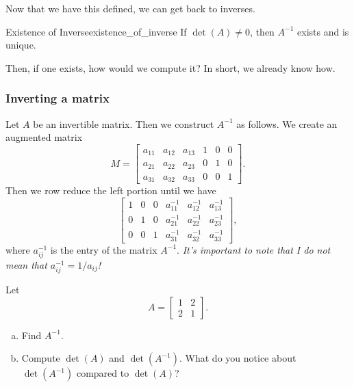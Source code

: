         Now that we have this defined, we can get back to inverses.
        
        \begin{prop}{Existence of Inverse}{existence_of_inverse}
        If $\det(A)\neq 0$, then $A^{-1}$ exists and is unique.
        \end{prop}
        
        Then, if one exists, how would we compute it?  In short, we already know how.
        
        \subsubsection{Inverting a matrix}
        
        Let $A$ be an invertible matrix.  Then we construct $A^{-1}$ as follows.  We create an augmented matrix
        \[
        M=
        \left[ \begin{array}{ccc|ccc}
        a_{11} & a_{12} & a_{13} & 1 & 0 & 0 \\
        a_{21} & a_{22} & a_{23} & 0 & 1 & 0 \\
        a_{31} & a_{32} & a_{33} & 0 & 0 & 1 
        \end{array} \right].
        \]
        Then we row reduce the left portion until we have
        \[
        \left[ \begin{array}{ccc|ccc}
        1 & 0 & 0 & a_{11}^{-1} & a_{12}^{-1} & a_{13}^{-1}\\
        0 & 1 & 0 & a_{21}^{-1} & a_{22}^{-1} & a_{23}^{-1} \\
        0 & 0 & 1 & a_{31}^{-1} & a_{32}^{-1} & a_{33}^{-1} 
        \end{array} \right],
        \]
        where $a_{ij}^{-1}$ is the entry of the matrix $A^{-1}$.  \emph{It's important to note that I do not mean that $a_{ij}^{-1}=1/a_{ij}$!}
        
        \begin{exercise}
        Let
        \[
        A=\begin{bmatrix}
        1 & 2\\
        2 & 1
        \end{bmatrix}.
        \]
        \begin{enumerate}[(a)]
            \item Find $A^{-1}$.
            \item Compute $\det(A)$ and $\det(A^{-1})$. What do you notice about $\det(A^{-1})$ compared to $\det(A)$?
        \end{enumerate}
        \end{exercise}
        
